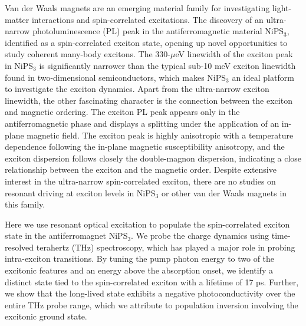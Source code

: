 \documentclass[
 reprint,
superscriptaddress,

 amsmath,amssymb,
 aps,

]{revtex4-2}
\begin{document}
Van der Waals magnets are an emerging material family for investigating light-matter interactions and spin-correlated excitations\cite{Kang2020,Wang2021,Hwangbo2021, Kim2023, Dirnberger2022,Afanasiev2021,Belvin2021,Ergeçen2022,Mai2021,Lee2016,Tan2022}. The discovery of an ultra-narrow photoluminescence (PL) peak in the antiferromagnetic material NiPS$_3$, identified as a spin-correlated exciton state, opening up novel opportunities to study coherent many-body excitons\cite{Kang2020, Jana, Dirnberger2022, Klaproth2023}. The 330-$\mu$eV linewidth of the exciton peak in NiPS$_3$\cite{Wang2021,Hwangbo2021} is significantly narrower than the typical sub-10 meV exciton linewidth found in two-dimensional semiconductors\cite{Ross2013,Cadiz2017,Wierzbowski2017}, which makes NiPS$_3$ an ideal platform to investigate the exciton dynamics. Apart from the ultra-narrow exciton linewidth, the other fascinating character is the connection between the exciton and magnetic ordering. The exciton PL peak appears only in the antiferromagnetic phase\cite{Wang2021,Hwangbo2021,Kim2023} and displays a splitting under the application of an in-plane magnetic field\cite{Jana, Wang2024}. The exciton peak is highly anisotropic with a temperature dependence following the in-plane magnetic susceptibility anisotropy\cite{Hwangbo2021}, and the exciton dispersion follows closely the double-magnon dispersion\cite{He2024}, indicating a close relationship between the exciton and the magnetic order. Despite extensive interest in the ultra-narrow spin-correlated exciton, there are no studies on resonant driving at exciton levels in NiPS$_3$ or other van der Waals magnets in this family.

Here we use resonant optical excitation to populate the spin-correlated exciton state in the antiferromagnet NiPS$_3$. We probe the charge dynamics using time-resolved terahertz (THz) spectroscopy, which has played a major role in probing intra-exciton transitions\cite{Kaindl2003,Mehio2023,Huber2006}. By tuning the pump photon energy to two of the excitonic features and an energy above the absorption onset, we identify a distinct state tied to the spin-correlated exciton with a lifetime of 17 ps. Further, we show that the long-lived state exhibits a negative photoconductivity over the entire THz probe range, which we attribute to population inversion involving the excitonic ground state.
\end{document}
